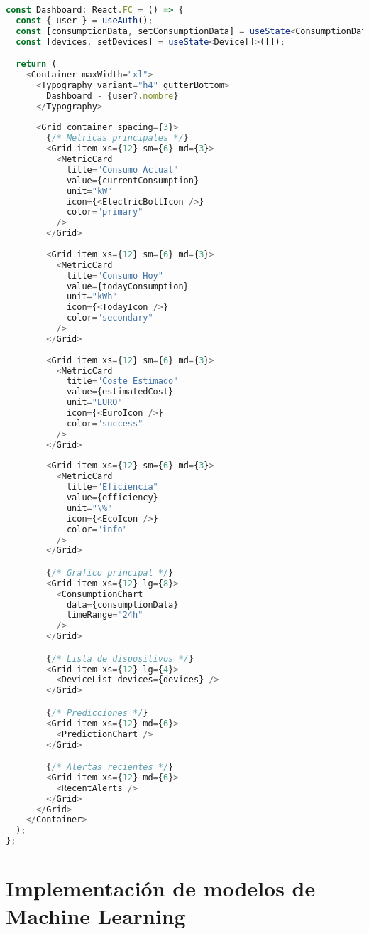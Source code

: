 \begin{lstlisting}[language=TypeScript, caption=Dashboard responsive]
const Dashboard: React.FC = () => {
  const { user } = useAuth();
  const [consumptionData, setConsumptionData] = useState<ConsumptionData[]>([]);
  const [devices, setDevices] = useState<Device[]>([]);

  return (
    <Container maxWidth="xl">
      <Typography variant="h4" gutterBottom>
        Dashboard - {user?.nombre}
      </Typography>
      
      <Grid container spacing={3}>
        {/* Metricas principales */}
        <Grid item xs={12} sm={6} md={3}>
          <MetricCard
            title="Consumo Actual"
            value={currentConsumption}
            unit="kW"
            icon={<ElectricBoltIcon />}
            color="primary"
          />
        </Grid>
        
        <Grid item xs={12} sm={6} md={3}>
          <MetricCard
            title="Consumo Hoy"
            value={todayConsumption}
            unit="kWh"
            icon={<TodayIcon />}
            color="secondary"
          />
        </Grid>
        
        <Grid item xs={12} sm={6} md={3}>
          <MetricCard
            title="Coste Estimado"
            value={estimatedCost}
            unit="EURO"
            icon={<EuroIcon />}
            color="success"
          />
        </Grid>
        
        <Grid item xs={12} sm={6} md={3}>
          <MetricCard
            title="Eficiencia"
            value={efficiency}
            unit="\%"
            icon={<EcoIcon />}
            color="info"
          />
        </Grid>

        {/* Grafico principal */}
        <Grid item xs={12} lg={8}>
          <ConsumptionChart
            data={consumptionData}
            timeRange="24h"
          />
        </Grid>

        {/* Lista de dispositivos */}
        <Grid item xs={12} lg={4}>
          <DeviceList devices={devices} />
        </Grid>

        {/* Predicciones */}
        <Grid item xs={12} md={6}>
          <PredictionChart />
        </Grid>

        {/* Alertas recientes */}
        <Grid item xs={12} md={6}>
          <RecentAlerts />
        </Grid>
      </Grid>
    </Container>
  );
};
\end{lstlisting}

\section{Implementación de modelos de Machine Learning}


